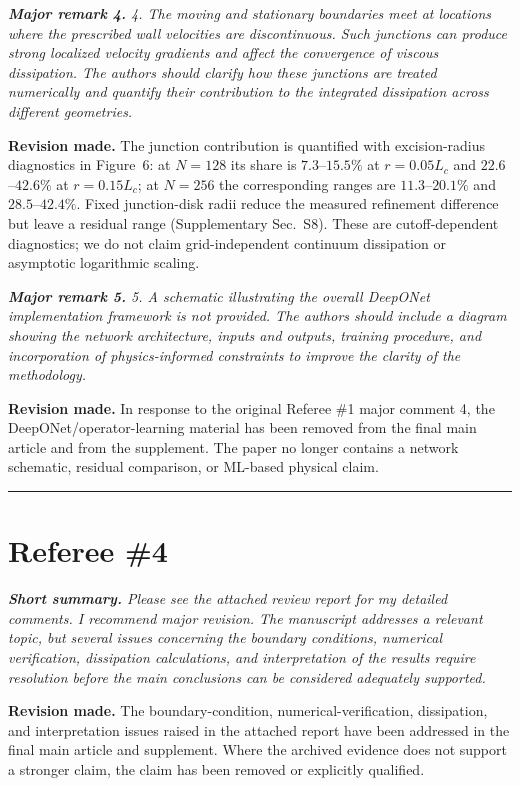 \documentclass[11pt,a4paper]{article}
\newcommand{\qcomment}[1]{\textcolor{deepblue}{\itshape #1}}
\newcommand{\revwork}[1]{\textbf{\textcolor{revgreen}{#1}}}
\newcommand{\ruleline}{\begin{center}\rule{0.6\textwidth}{0.6pt}\end{center}}
\begin{document}
\medskip
\noindent\qcomment{\textbf{Major remark 4.} 4. The moving and stationary boundaries meet at locations where the prescribed wall velocities are discontinuous. Such junctions can produce strong localized velocity gradients and affect the convergence of viscous dissipation. The authors should clarify how these junctions are treated numerically and quantify their contribution to the integrated dissipation across different geometries.}

\noindent\revwork{Revision made.} The junction contribution is quantified with excision-radius diagnostics in Figure~6: at $N=128$ its share is $7.3$--$15.5\%$ at $r=0.05L_c$ and $22.6$--$42.6\%$ at $r=0.15L_c$; at $N=256$ the corresponding ranges are $11.3$--$20.1\%$ and $28.5$--$42.4\%$. Fixed junction-disk radii reduce the measured refinement difference but leave a residual range (Supplementary Sec.~S8). These are cutoff-dependent diagnostics; we do not claim grid-independent continuum dissipation or asymptotic logarithmic scaling.

\medskip
\noindent\qcomment{\textbf{Major remark 5.} 5. A schematic illustrating the overall DeepONet implementation framework is not provided. The authors should include a diagram showing the network architecture, inputs and outputs, training procedure, and incorporation of physics-informed constraints to improve the clarity of the methodology.}

\noindent\revwork{Revision made.} In response to the original Referee \#1 major comment 4, the DeepONet/operator-learning material has been removed from the final main article and from the supplement. The paper no longer contains a network schematic, residual comparison, or ML-based physical claim.

\bigskip
\ruleline

\section*{Referee \#4}

\medskip
\noindent\qcomment{\textbf{Short summary.} Please see the attached review report for my detailed comments. I recommend major revision. The manuscript addresses a relevant topic, but several issues concerning the boundary conditions, numerical verification, dissipation calculations, and interpretation of the results require resolution before the main conclusions can be considered adequately supported.}

\noindent\revwork{Revision made.} The boundary-condition, numerical-verification, dissipation, and interpretation issues raised in the attached report have been addressed in the final main article and supplement. Where the archived evidence does not support a stronger claim, the claim has been removed or explicitly qualified.
\end{document}
